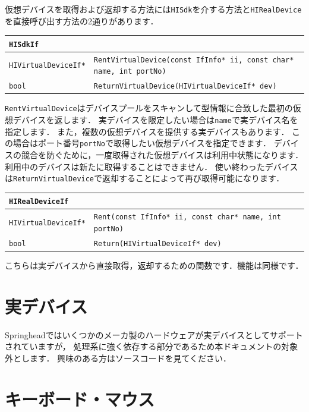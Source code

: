 \KLUDGE 仮想デバイスを取得および返却する方法には\texttt{HISdk}\KLUDGE を介する方法と\texttt{HIRealDevice}\KLUDGE を直接呼び出す方法の2\KLUDGE 通りがあります．
\begin{center}
\begin{tabular}{p{.25\hsize}p{.65\hsize}}
\texttt{HISdkIf}																							\\ \midrule
\texttt{HIVirtualDeviceIf*} & \texttt{RentVirtualDevice(const IfInfo* ii, const char* name, int portNo)}	\\
\texttt{bool}				& \texttt{ReturnVirtualDevice(HIVirtualDeviceIf* dev)}	\\
\end{tabular}
\end{center}
\texttt{RentVirtualDevice}\KLUDGE はデバイスプールをスキャンして型情報に合致した最初の仮想デバイスを返します．
\KLUDGE 実デバイスを限定したい場合は\texttt{name}\KLUDGE で実デバイス名を指定します．
\KLUDGE また，複数の仮想デバイスを提供する実デバイスもあります．
\KLUDGE この場合はポート番号\texttt{portNo}\KLUDGE で取得したい仮想デバイスを指定できます．
%
\KLUDGE デバイスの競合を防ぐために，一度取得された仮想デバイスは利用中状態になります．
\KLUDGE 利用中のデバイスは新たに取得することはできません．
\KLUDGE 使い終わったデバイスは\texttt{ReturnVirtualDevice}\KLUDGE で返却することによって再び取得可能になります．
\begin{center}
\begin{tabular}{p{.25\hsize}p{.65\hsize}}
\texttt{HIRealDeviceIf}																				\\ \midrule
\texttt{HIVirtualDeviceIf*}	& \texttt{Rent(const IfInfo* ii, const char* name, int portNo)}	\\
\texttt{bool}				& \texttt{Return(HIVirtualDeviceIf* dev)}
\end{tabular}
\end{center}
\KLUDGE こちらは実デバイスから直接取得，返却するための関数です．機能は同様です．


\section{\KLUDGE 実デバイス}

Springhead\KLUDGE ではいくつかのメーカ製のハードウェアが実デバイスとしてサポートされていますが，
\KLUDGE 処理系に強く依存する部分であるため本ドキュメントの対象外とします．
\KLUDGE 興味のある方はソースコードを見てください．

\section{\KLUDGE キーボード・マウス}
\label{sec_hi_keymouse}

